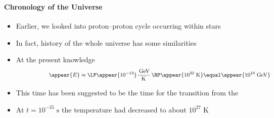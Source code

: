 \begin{frame}
\frametitle{\texorpdfstring{\culine[\sectiontitleulinecolor]{\sectiontitle}}{\sectiontitle} }
\framesubtitle{Chronology of the Universe}

\begin{itemize}
	\item Earlier, we looked into proton–proton cycle occurring within stars

\item In fact, history of the whole universe has some similarities

\item At the present knowledge  \vspace{-4mm}
\[
\hspace{2cm} \appear{E} \approx \LP \appear{10^{-13}} \frac{\mathrm{\;GeV}}{\mathrm{K}} \,\RP  \appear{10^{32} \mathrm{\;K}}  \equal \appear{10^{19} \mathrm{\;GeV}}
\]

\item This time has been suggested to be the time for the transition from the  

\item At $t=10^{-35} \mathrm{\;s}$ the temperature had decreased to about $10^{27} \mathrm{\;K}$ 
\end{itemize}

\endofslide 
\end{frame}

